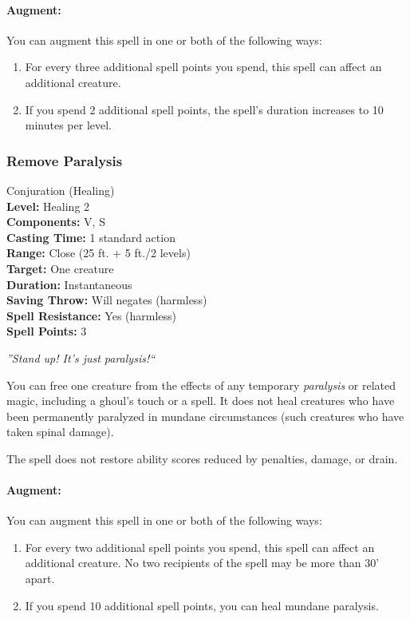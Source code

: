 \paragraph{Augment:} You can augment this spell in one or both of the following ways:
\begin{enumerate}
 \item For every three additional spell points you spend, this spell can affect an additional creature.
 \item If you spend 2 additional spell points, the spell's duration increases to 10 minutes per level.
\end{enumerate}
\subsubsection{Remove Paralysis}
\label{Spell:RemoveParalysis}
Conjuration (Healing)
\\ \textbf{Level:} Healing 2
\\ \textbf{Components:} V, S
\\ \textbf{Casting Time:} 1 standard action
\\ \textbf{Range:} Close (25 ft. + 5 ft./2 levels)
\\ \textbf{Target:} One creature
\\ \textbf{Duration:} Instantaneous
\\ \textbf{Saving Throw:} Will negates (harmless)
\\ \textbf{Spell Resistance:} Yes (harmless)
\\ \textbf{Spell Points:} 3

\emph{''Stand up! It's just paralysis!``}

You can free one creature from the effects of any temporary \emph{paralysis} or related magic, including a ghoul's touch or a  spell. It does not heal creatures who have been permanently paralyzed in mundane circumstances (such creatures who have taken spinal damage).

The spell does not restore ability scores reduced by penalties, damage, or drain.

\paragraph{Augment:} You can augment this spell in one or both of the following ways:
\begin{enumerate}
 \item For every two additional spell points you spend, this spell can affect an additional creature.
No two recipients of the spell may be more than 30' apart. 
 \item If you spend 10 additional spell points, you can heal mundane paralysis.
\end{enumerate}
